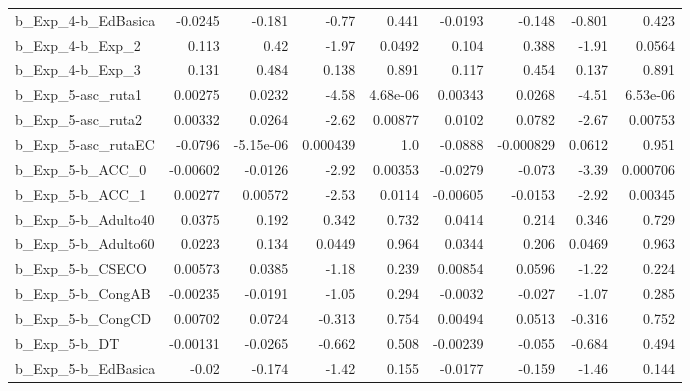 \begin{tabular}{lrrrrrrrr}
b\_Exp\_4-b\_EdBasica         &     -0.0245 &       -0.181 &     -0.77 &    0.441 &    -0.0193 &      -0.148 &       -0.801 &         0.423 \\
b\_Exp\_4-b\_Exp\_2            &       0.113 &         0.42 &     -1.97 &   0.0492 &      0.104 &       0.388 &        -1.91 &        0.0564 \\
b\_Exp\_4-b\_Exp\_3            &       0.131 &        0.484 &     0.138 &    0.891 &      0.117 &       0.454 &        0.137 &         0.891 \\
b\_Exp\_5-asc\_ruta1          &     0.00275 &       0.0232 &     -4.58 & 4.68e-06 &    0.00343 &      0.0268 &        -4.51 &      6.53e-06 \\
b\_Exp\_5-asc\_ruta2          &     0.00332 &       0.0264 &     -2.62 &  0.00877 &     0.0102 &      0.0782 &        -2.67 &       0.00753 \\
b\_Exp\_5-asc\_rutaEC         &     -0.0796 &    -5.15e-06 &  0.000439 &      1.0 &    -0.0888 &   -0.000829 &       0.0612 &         0.951 \\
b\_Exp\_5-b\_ACC\_0            &    -0.00602 &      -0.0126 &     -2.92 &  0.00353 &    -0.0279 &      -0.073 &        -3.39 &      0.000706 \\
b\_Exp\_5-b\_ACC\_1            &     0.00277 &      0.00572 &     -2.53 &   0.0114 &   -0.00605 &     -0.0153 &        -2.92 &       0.00345 \\
b\_Exp\_5-b\_Adulto40         &      0.0375 &        0.192 &     0.342 &    0.732 &     0.0414 &       0.214 &        0.346 &         0.729 \\
b\_Exp\_5-b\_Adulto60         &      0.0223 &        0.134 &    0.0449 &    0.964 &     0.0344 &       0.206 &       0.0469 &         0.963 \\
b\_Exp\_5-b\_CSECO            &     0.00573 &       0.0385 &     -1.18 &    0.239 &    0.00854 &      0.0596 &        -1.22 &         0.224 \\
b\_Exp\_5-b\_CongAB           &    -0.00235 &      -0.0191 &     -1.05 &    0.294 &    -0.0032 &      -0.027 &        -1.07 &         0.285 \\
b\_Exp\_5-b\_CongCD           &     0.00702 &       0.0724 &    -0.313 &    0.754 &    0.00494 &      0.0513 &       -0.316 &         0.752 \\
b\_Exp\_5-b\_DT               &    -0.00131 &      -0.0265 &    -0.662 &    0.508 &   -0.00239 &      -0.055 &       -0.684 &         0.494 \\
b\_Exp\_5-b\_EdBasica         &       -0.02 &       -0.174 &     -1.42 &    0.155 &    -0.0177 &      -0.159 &        -1.46 &         0.144 \\

\end{tabular}
